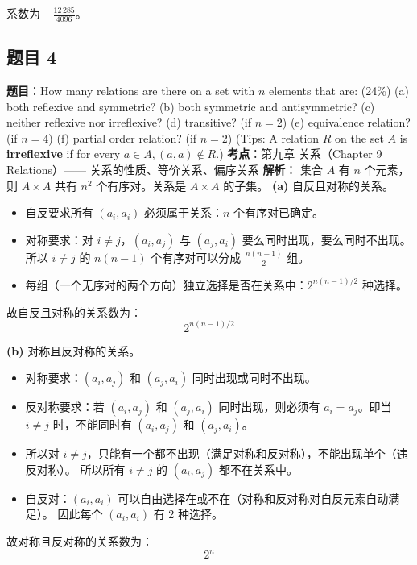 \documentclass[10pt,a4paper,openany]{ctexbook}
\theoremstyle{definition}
\theoremstyle{remark}
\begin{document}
系数为 $\displaystyle -\frac{12\,285}{4096}$。
\vspace{-2pt}

\subsection{题目 4}

\textbf{题目}：How many relations are there on a set with $n$ elements that are: (24\%)
(a) both reflexive and symmetric?
(b) both symmetric and antisymmetric?
(c) neither reflexive nor irreflexive?
(d) transitive? (if $n=2$)
(e) equivalence relation? (if $n=4$)
(f) partial order relation? (if $n=2$)
(Tips: A relation $R$ on the set $A$ is \textbf{irreflexive} if for every $a \in A, (a,a) \notin R$.)
\textbf{考点}：第九章 关系（Chapter 9 Relations）—— 关系的性质、等价关系、偏序关系
\textbf{解析}：
集合 $A$ 有 $n$ 个元素，则 $A \times A$ 共有 $n^2$ 个有序对。关系是 $A \times A$ 的子集。
\textbf{(a)} 自反且对称的关系。
\begin{itemize}
\item 自反要求所有 $(a_i, a_i)$ 必须属于关系：$n$ 个有序对已确定。
\item 对称要求：对 $i \neq j$，$(a_i, a_j)$ 与 $(a_j, a_i)$ 要么同时出现，要么同时不出现。所以 $i \neq j$ 的 $n(n-1)$ 个有序对可以分成 $\frac{n(n-1)}{2}$ 组。
\item 每组（一个无序对的两个方向）独立选择是否在关系中：$2^{n(n-1)/2}$ 种选择。

\end{itemize}

故自反且对称的关系数为：
\[
2^{n(n-1)/2}
\]

\textbf{(b)} 对称且反对称的关系。
\begin{itemize}
\item 对称要求：$(a_i, a_j)$ 和 $(a_j, a_i)$ 同时出现或同时不出现。
\item 反对称要求：若 $(a_i, a_j)$ 和 $(a_j, a_i)$ 同时出现，则必须有 $a_i = a_j$。即当 $i \neq j$ 时，不能同时有 $(a_i, a_j)$ 和 $(a_j, a_i)$。
\item 所以对 $i \neq j$，只能有一个都不出现（满足对称和反对称），不能出现单个（违反对称）。
所以所有 $i \neq j$ 的 $(a_i, a_j)$ 都不在关系中。

\item 自反对：$(a_i, a_i)$ 可以自由选择在或不在（对称和反对称对自反元素自动满足）。
因此每个 $(a_i, a_i)$ 有 2 种选择。


\end{itemize}

故对称且反对称的关系数为：
\[
2^n
\]
\end{document}
